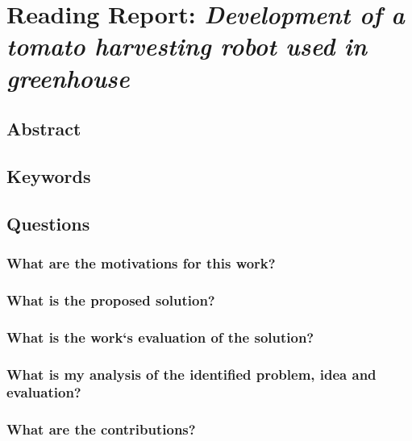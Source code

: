 \documentclass{article}
\begin{document}



\section{Reading Report: \emph{Development of a tomato harvesting robot used in greenhouse}}
\cite{Lili2017}

\subsection*{Abstract}

\subsection*{Keywords}

\subsection*{Questions}

\subsubsection*{What are the motivations for this work?}
\subsubsection*{What is the proposed solution?}
\subsubsection*{What is the work`s evaluation of the solution?}
\subsubsection*{What is my analysis of the identified problem, idea  and evaluation?}
\subsubsection*{What are the contributions?}
\end{document}

